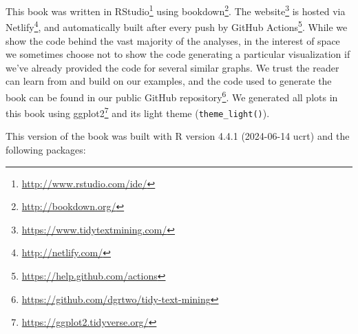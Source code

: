 \documentclass[
]{book}
\DeclareRobustCommand{\href}[2]{#2\footnote{\url{#1}}}
\begin{document}
This book was written in \href{http://www.rstudio.com/ide/}{RStudio} using \href{http://bookdown.org/}{bookdown}. The \href{https://www.tidytextmining.com/}{website} is hosted via \href{http://netlify.com/}{Netlify}, and automatically built after every push by \href{https://help.github.com/actions}{GitHub Actions}. While we show the code behind the vast majority of the analyses, in the interest of space we sometimes choose not to show the code generating a particular visualization if we've already provided the code for several similar graphs. We trust the reader can learn from and build on our examples, and the code used to generate the book can be found in our \href{https://github.com/dgrtwo/tidy-text-mining}{public GitHub repository}. We generated all plots in this book using \href{https://ggplot2.tidyverse.org/}{ggplot2} and its light theme (\texttt{theme\_light()}).

This version of the book was built with R version 4.4.1 (2024-06-14 ucrt) and the following packages:
\end{document}
